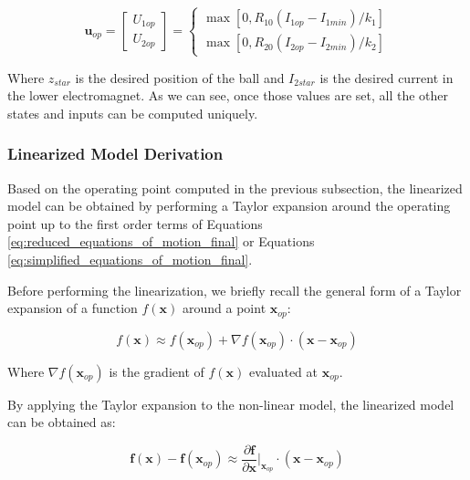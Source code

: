 \begin{equation}
    \mathbf{u}_{op} =
    \begin{bmatrix}
        U_{1op} \\
        U_{2op}
    \end{bmatrix}
    =
    \begin{cases}
        \max{\left[0, R_{10} \left( I_{1op} - I_{1min} \right) / k_1 \right]} \\
        \max{\left[0, R_{20} \left( I_{2op} - I_{2min} \right) / k_2 \right]}
    \end{cases}
\end{equation}

Where $z_{star}$ is the desired position of the ball and $I_{2star}$ is the desired current in the lower electromagnet.
As we can see, once those values are set, all the other states and inputs can be computed uniquely.


\subsubsection{Linearized Model Derivation}
\label{subsubsec:linearized_model_derivation}

Based on the operating point computed in the previous subsection, the linearized model can be obtained by performing a Taylor expansion around the operating point up to the first order terms of Equations \ref{eq:reduced_equations_of_motion_final} or Equations \ref{eq:simplified_equations_of_motion_final}.

Before performing the linearization, we briefly recall the general form of a Taylor expansion of a function $f(\mathbf{x})$ around a point $\mathbf{x}_{op}$:

\begin{equation}
    f(\mathbf{x}) \approx f(\mathbf{x}_{op}) + \nabla f(\mathbf{x}_{op}) \cdot (\mathbf{x} - \mathbf{x}_{op})
\end{equation}

Where $\nabla f(\mathbf{x}_{op})$ is the gradient of $f(\mathbf{x})$ evaluated at $\mathbf{x}_{op}$.

By applying the Taylor expansion to the non-linear model, the linearized model can be obtained as:

\begin{equation}
    \mathbf{f}(\mathbf{x}) - \mathbf{f}(\mathbf{x}_{op})\approx \frac{\partial \mathbf{f}}{\partial \mathbf{x}} \Bigg|_{\mathbf{x}_{op}} \cdot (\mathbf{x} - \mathbf{x}_{op})
\end{equation}

